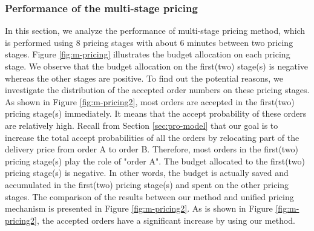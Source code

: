 \documentclass[sigconf,authordraft]{acmart}
\begin{document}
\subsubsection{Performance of the multi-stage pricing}

In this section, we analyze the performance of multi-stage pricing method, which is performed using 8 pricing stages with about 6 minutes between two pricing stages. Figure \ref{fig:m-pricing} illustrates the budget allocation on each pricing stage. We observe that the budget allocation on the first(two) stage(s) is negative whereas the other stages are positive. To find out the potential reasons, we investigate the distribution of the accepted order numbers on these pricing stages. As shown in Figure \ref{fig:m-pricing2}, most orders are accepted in the first(two) pricing stage(s) immediately. It means that the accept probability of these orders are relatively high. Recall from Section \ref{sec:pro-model} that our goal is to increase the total accept probabilities of all the orders by relocating part of the delivery price from order A to order B. Therefore, most orders in the first(two) pricing stage(s) play the role of "order A". The budget allocated to the first(two) pricing stage(s) is negative. In other words, the budget is actually saved and accumulated in the first(two) pricing stage(s) and spent on the other pricing stages. The comparison of the results between our method and unified pricing mechanism is presented in Figure \ref{fig:m-pricing2}. As is shown in Figure \ref{fig:m-pricing2}, the accepted orders have a significant increase by using our method. 
\end{document}
